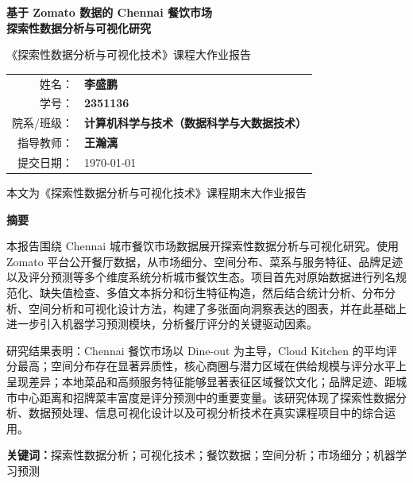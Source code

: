 \documentclass[11pt,a4paper]{article}
\begin{document}
\begin{titlepage}
\centering
\vspace*{2cm}
{\LARGE\bfseries 基于 Zomato 数据的 Chennai 餐饮市场\\[0.4cm]
探索性数据分析与可视化研究}
\vspace{1.5cm}

{\large 《探索性数据分析与可视化技术》课程大作业报告}
\vspace{2cm}

{\large
\renewcommand{\arraystretch}{1.8}
\begin{tabular}{rl}
姓名：& {\bfseries 李盛鹏} \\
学号：& {\bfseries 2351136} \\
院系/班级：& {\bfseries 计算机科学与技术（数据科学与大数据技术）} \\
指导教师：& {\bfseries 王瀚漓} \\
提交日期：& \today
\end{tabular}
}

\vfill
{\small 本文为《探索性数据分析与可视化技术》课程期末大作业报告}
\end{titlepage}

\newpage
\thispagestyle{empty}
\begin{center}
{\Large\bfseries 摘\quad 要}
\end{center}
\vspace{0.5cm}

本报告围绕 Chennai 城市餐饮市场数据展开探索性数据分析与可视化研究。使用 Zomato 平台公开餐厅数据，从市场细分、空间分布、菜系与服务特征、品牌足迹以及评分预测等多个维度系统分析城市餐饮生态。项目首先对原始数据进行列名规范化、缺失值检查、多值文本拆分和衍生特征构造，然后结合统计分析、分布分析、空间分析和可视化设计方法，构建了多张面向洞察表达的图表，并在此基础上进一步引入机器学习预测模块，分析餐厅评分的关键驱动因素。

研究结果表明：Chennai 餐饮市场以 Dine-out 为主导，Cloud Kitchen 的平均评分最高；空间分布存在显著异质性，核心商圈与潜力区域在供给规模与评分水平上呈现差异；本地菜品和高频服务特征能够显著表征区域餐饮文化；品牌足迹、距城市中心距离和招牌菜丰富度是评分预测中的重要变量。该研究体现了探索性数据分析、数据预处理、信息可视化设计以及可视分析技术在真实课程项目中的综合运用。

\vspace{0.5cm}
\noindent\textbf{关键词：}探索性数据分析；可视化技术；餐饮数据；空间分析；市场细分；机器学习预测
\end{document}
